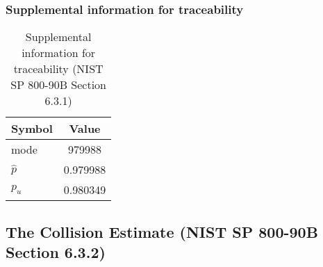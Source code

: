 \documentclass[a3paper,xelatex,english]{bxjsarticle}
\begin{document}
\subsubsection{Supplemental information for traceability}
\renewcommand{\arraystretch}{1.8}
\begin{table}[h]
\caption{Supplemental information for traceability (NIST SP 800-90B Section 6.3.1)}
\begin{center}
\begin{tabular}{|l|c|}
\hline 
\rowcolor{anotherlightblue} %
Symbol				& Value \\ \hline 
mode				&   979988\\ \hline 
$\hat{p}$ 			& 0.979988\\ \hline
$p_u$				& 0.980349\\ \hline
\end{tabular}
\end{center}
\end{table}
\renewcommand{\arraystretch}{1.4}
\clearpage
\subsection{The Collision Estimate (NIST SP 800-90B Section 6.3.2)}\label{sec:Binary632}
\end{document}

